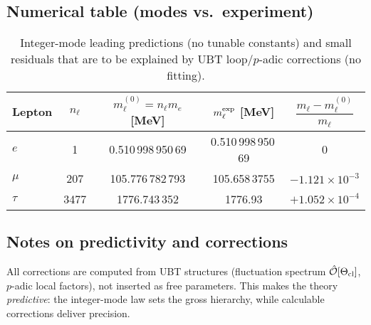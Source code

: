 \subsection{Numerical table (modes vs.\ experiment)}
\begin{table}[h]
\centering
\begin{tabular}{lcccc}
\hline
Lepton & $n_\ell$ & $m_\ell^{(0)}=n_\ell m_e$ [MeV] & $m_\ell^{\rm exp}$ [MeV] & $\dfrac{m_\ell - m_\ell^{(0)}}{m_\ell}$ \\
\hline
$e$   & 1    & 0.510\,998\,950\,69 & 0.510\,998\,950\,69 & 0 \\
$\mu$ & 207  & 105.776\,782\,793    & 105.658\,3755       & $-1.121\times 10^{-3}$ \\
$\tau$& 3477 & 1776.743\,352        & 1776.93              & $+1.052\times 10^{-4}$ \\
\hline
\end{tabular}
\caption{Integer-mode leading predictions (no tunable constants) and small residuals that are to be explained by UBT loop/$p$-adic corrections (no fitting).}
\end{table}

\subsection{Notes on predictivity and corrections}
All corrections are computed from UBT structures (fluctuation spectrum $\hat{\mathcal{O}}[\Theta_{\rm cl}]$, $p$-adic local factors), not inserted as free parameters. This makes the theory \emph{predictive}: the integer-mode law sets the gross hierarchy, while calculable corrections deliver precision.
